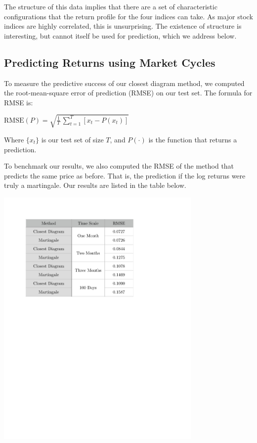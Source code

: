 \documentclass{article}
\begin{document}
The structure of this data implies that there are a set of characteristic configurations that the return profile for the four indices can take. As major stock indices are highly correlated, this is unsurprising. The existence of structure is interesting, but cannot itself be used for prediction, which we address below.


\newpage

\subsection{Predicting Returns using Market Cycles}
To measure the predictive success of our closest diagram method, we computed the root-mean-square error of prediction (RMSE) on our test set. The formula for RMSE is: 

\begin{center}{
$\mathrm{RMSE}(P) = \sqrt{\frac{1}{T} \, \sum\limits_{t=1}^T [x_t - P(x_t)]} $
}\end{center}

Where  $\{x_t\}$ is our test set of size $T$, and $P(\cdot)$ is the function that returns a prediction.

To benchmark our results, we also computed the RMSE of the method that predicts the same price as before. That is, the prediction if the log returns were truly a martingale. Our results are listed in the table below.

\begin{center}{
\includegraphics[width=0.75\textwidth]{rmse}
}\end{center}
\end{document}
